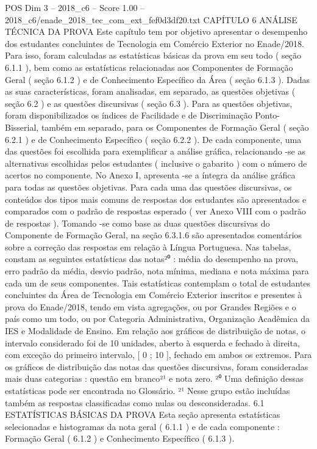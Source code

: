 \begin{textsample}{POS Dim 3 – 2018\_c6 – Score 1.00 – 2018\_c6/enade\_2018\_tec\_com\_ext\_fef0d3df20.txt}  \label{ex:f3_pos_119}
CAPÍTULO 6 ANÁLISE TÉCNICA DA PROVA Este capítulo tem por objetivo apresentar o desempenho dos estudantes concluintes de Tecnologia em Comércio Exterior no Enade/2018.
Para isso, foram calculadas as estatísticas básicas da prova em seu todo ( seção 6.1.1 ), bem como as estatísticas relacionadas aos Componentes de Formação Geral ( seção 6.1.2 ) e de Conhecimento Específico da Área ( seção 6.1.3 ).
Dadas as suas características, foram analisadas, em separado, as questões objetivas ( seção 6.2 ) e as questões discursivas ( seção 6.3 ).
Para as questões objetivas, foram disponibilizados os índices de Facilidade e de Discriminação Ponto-Bisserial, também em separado, para os Componentes de Formação Geral ( seção 6.2.1 ) e de Conhecimento Específico ( seção 6.2.2 ).
De cada componente, uma das questões foi escolhida para exemplificar a análise gráfica, relacionando -se as alternativas escolhidas pelos estudantes ( inclusive o gabarito ) com o número de acertos no componente.
No Anexo I, apresenta -se a íntegra da análise gráfica para todas as questões objetivas.
Para cada uma das questões discursivas, os conteúdos dos tipos mais comuns de respostas dos estudantes são apresentados e comparados com o padrão de respostas esperado ( ver Anexo VIII com o padrão de respostas ).
Tomando -se como base as duas questões discursivas do Componente de Formação Geral, na seção 6.3.1.6 são apresentados comentários sobre a correção das respostas em relação à Língua Portuguesa.
Nas tabelas, constam as seguintes estatísticas das notas²⁰ : média do desempenho na prova, erro padrão da média, desvio padrão, nota mínima, mediana e nota máxima para cada um de seus componentes.
Tais estatísticas contemplam o total de estudantes concluintes da Área de Tecnologia em Comércio Exterior inscritos e presentes à prova do Enade/2018, tendo em vista agregações, ou por Grandes Regiões e o país como um todo, ou por Categoria Administrativa, Organização Acadêmica da IES e Modalidade de Ensino.
Em relação aos gráficos de distribuição de notas, o intervalo considerado foi de 10 unidades, aberto à esquerda e fechado à direita, com exceção do primeiro intervalo, [ 0 ; 10 ], fechado em ambos os extremos.
Para os gráficos de distribuição das notas das questões discursivas, foram consideradas mais duas categorias : questão em branco²¹ e nota zero. ²⁰ Uma definição dessas estatísticas pode ser encontrada no Glossário. ²¹ Nesse grupo estão incluídas também as respostas classificadas como nulas ou desconsideradas. 6.1 ESTATÍSTICAS BÁSICAS DA PROVA Esta seção apresenta estatísticas selecionadas e histogramas da nota geral ( 6.1.1 ) e de cada componente : Formação Geral ( 6.1.2 ) e Conhecimento Específico ( 6.1.3 ).

\end{textsample}

